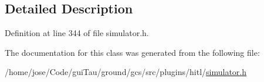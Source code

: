 \subsection{Detailed Description}


Definition at line 344 of file simulator.\-h.



The documentation for this class was generated from the following file\-:\begin{DoxyCompactItemize}
\item 
/home/jose/\-Code/gui\-Tau/ground/gcs/src/plugins/hitl/\hyperlink{simulator_8h}{simulator.\-h}\end{DoxyCompactItemize}
